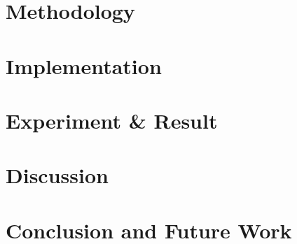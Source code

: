 \documentclass[12pt,a4paper]{report}
\begin{document}
\chapter{Methodology}
\newpage











\chapter{Implementation}
\newpage


\chapter{Experiment \& Result}
\newpage







\chapter{Discussion}
\newpage


\chapter{Conclusion and Future Work}
\newpage




\titleformat{\chapter}[display]
{\normalfont\huge\bfseries}{\chaptertitlename\ \thechapter}{20pt}{\Huge}
\titlespacing*{\chapter}{0pt}{50pt}{40pt}



\newpage
{}

\end{document}
